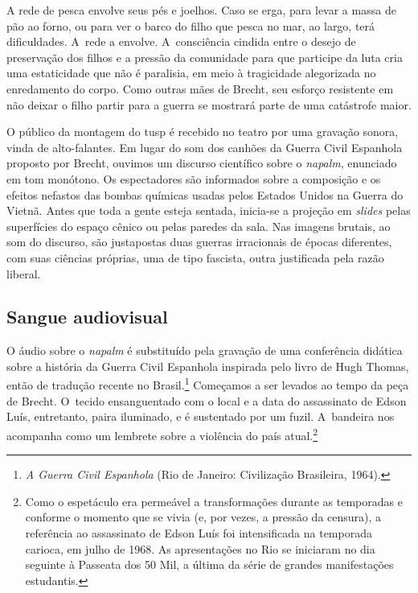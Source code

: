 {


A rede de pesca envolve seus pés e joelhos. Caso se erga, para levar a
massa de pão ao forno, ou para ver o barco do filho que pesca no mar, ao
largo, terá dificuldades. A~rede a envolve. A~consciência cindida entre
o desejo de preservação dos filhos e a pressão da comunidade para que
participe da luta cria uma estaticidade que não é paralisia, em meio à
tragicidade alegorizada no enredamento do corpo. Como outras mães de
Brecht, seu esforço resistente em não deixar o filho partir para a
guerra se mostrará parte de uma catástrofe maior.

O público da montagem do {\sc tusp} é recebido no teatro por uma gravação
sonora, vinda de alto-falantes. Em lugar do som dos canhões da Guerra
Civil Espanhola proposto por Brecht, ouvimos um discurso científico
sobre o {\it napalm}, enunciado em tom monótono. Os espectadores são
informados sobre a composição e os efeitos nefastos das bombas químicas
usadas pelos Estados Unidos na Guerra do Vietnã. Antes que toda a gente
esteja sentada, inicia-se a projeção em {\it slides} pelas superfícies
do espaço cênico ou pelas paredes da sala. Nas imagens brutais, ao som
do discurso, são justapostas duas guerras irracionais de épocas
diferentes, com suas ciências próprias, uma de tipo fascista, outra
justificada pela razão liberal.

\subsection{Sangue audiovisual}

O áudio sobre o {\it napalm} é substituído pela gravação de uma
conferência didática sobre a história da Guerra Civil Espanhola
inspirada pelo livro de Hugh Thomas, então de tradução recente no
Brasil.\footnote{{\it A Guerra Civil Espanhola} (Rio de Janeiro:
  Civilização Brasileira, 1964).} Começamos a ser levados ao tempo da
peça de Brecht. O~tecido ensanguentado com o local e a data do assassinato
de Edson Luís, entretanto, paira iluminado, e é sustentado por um
fuzil. A~bandeira nos acompanha como um lembrete sobre a violência do
país atual.\footnote{Como o espetáculo era permeável a transformações
  durante as temporadas e conforme o momento que se vivia (e, por vezes,
  a pressão da censura), a referência ao assassinato de Edson Luís foi
  intensificada na temporada carioca, em julho de 1968. As apresentações
  no Rio se iniciaram no dia seguinte à Passeata dos 50 Mil, a última da
  série de grandes manifestações estudantis.}

}
